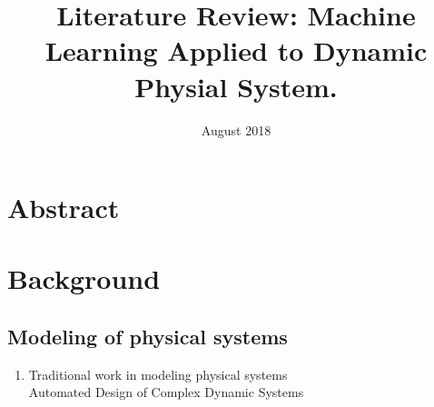 \documentclass{article}
\title{Literature Review: Machine Learning Applied to Dynamic Physial System.}
\date{August 2018}
\begin{document}
\maketitle

\section{Abstract}

\section{Background}
\subsection{Modeling of physical systems}
\begin{enumerate}
  \item Traditional work in modeling physical systems \\
  Automated Design of Complex Dynamic Systems \\


\end{enumerate}
\end{document}
